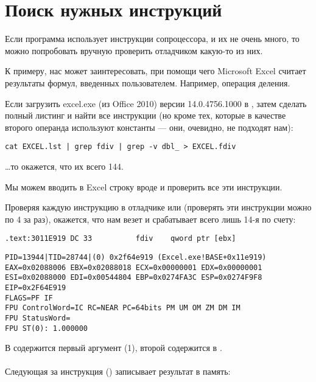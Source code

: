 \section{Поиск нужных инструкций}

Если программа использует инструкции сопроцессора, и их не очень много, 
то можно попробовать вручную проверить отладчиком какую-то из них.

\par К примеру, нас может заинтересовать, при помощи чего Microsoft Excel считает 
результаты формул, введенных пользователем. Например, операция деления.

\myindex{\GrepUsage}
Если загрузить excel.exe (из Office 2010) версии 14.0.4756.1000 в \IDA, затем сделать полный листинг 
и найти все инструкции \FDIV (но кроме тех, которые в качестве второго операнда используют константы --- они, 
очевидно, не подходят нам):

\begin{lstlisting}
cat EXCEL.lst | grep fdiv | grep -v dbl_ > EXCEL.fdiv
\end{lstlisting}

\dots то окажется, что их всего 144.

\par Мы можем вводить в Excel строку вроде  и проверить все эти инструкции.

\par Проверяя каждую инструкцию в отладчике или \tracer 
(проверять эти инструкции можно по 4 за раз), 
окажется, что нам везет и срабатывает всего лишь 14-я по счету:

\begin{lstlisting}[style=customasm]
.text:3011E919 DC 33          fdiv    qword ptr [ebx]
\end{lstlisting}

\begin{lstlisting}
PID=13944|TID=28744|(0) 0x2f64e919 (Excel.exe!BASE+0x11e919)
EAX=0x02088006 EBX=0x02088018 ECX=0x00000001 EDX=0x00000001
ESI=0x02088000 EDI=0x00544804 EBP=0x0274FA3C ESP=0x0274F9F8
EIP=0x2F64E919
FLAGS=PF IF
FPU ControlWord=IC RC=NEAR PC=64bits PM UM OM ZM DM IM 
FPU StatusWord=
FPU ST(0): 1.000000
\end{lstlisting}

В  содержится первый аргумент (1), второй содержится в \TT{[EBX]}.\\
\\
Следующая за \FDIV инструкция () записывает результат в память: \\

